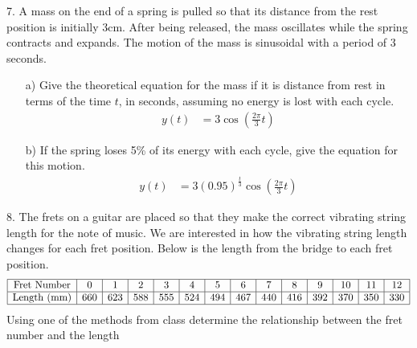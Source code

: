 \documentclass{article}
\newenvironment{solution}{\color{solutioncolor}}{}
\begin{document}
7. A mass on the end of a spring is pulled so that its distance from the rest position is initially 3cm. After being released, the mass oscillates while the spring contracts and expands. The motion of the mass is sinusoidal with a period of 3 seconds.
\begin{enumerate}
    \item[a)] Give the theoretical equation for the mass if it is distance from rest in terms of the time \( t \), in seconds, assuming no energy is lost with each cycle.
    \begin{solution}
        \begin{align*}
            y(t) &= 3 \cos\left(\frac{2\pi}{3} t\right)
        \end{align*}
    \end{solution}

    \item[b)] If the spring loses 5\% of its energy with each cycle, give the equation for this motion.
    \begin{solution}
        \begin{align*}
            y(t) &= 3 \left(0.95\right)^{\frac{t}{3}} \cos\left(\frac{2\pi}{3} t\right)
        \end{align*}
    \end{solution}
\end{enumerate}

8. The frets on a guitar are placed so that they make the correct vibrating string length for the note of music. We are interested in how the vibrating string length changes for each fret position. Below is the length from the bridge to each fret position.
\[
\begin{array}{|c|c|c|c|c|c|c|c|c|c|c|c|c|c|}
\hline
\text{Fret Number} & 0  & 1 & 2 & 3 & 4 & 5 & 6 & 7 & 8 & 9 & 10 & 11 & 12 \\
\hline
\text{Length (mm)} & 660 & 623 & 588 & 555 & 524 & 494 & 467 & 440 & 416 & 392 & 370 & 350 & 330 \\
\hline
\end{array}
\]
Using one of the methods from class determine the relationship between the fret number and the length 
\end{document}
